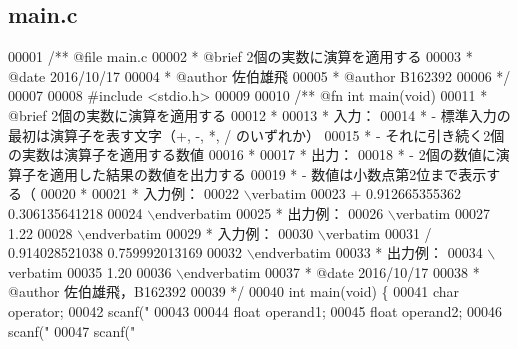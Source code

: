 \subsection{main.\-c}

\begin{DoxyCode}
00001 \textcolor{comment}{/**  @file main.c}
00002 \textcolor{comment}{ *   @brief  2個の実数に演算を適用する}
00003 \textcolor{comment}{ *   @date   2016/10/17}
00004 \textcolor{comment}{ *   @author 佐伯雄飛}
00005 \textcolor{comment}{ *   @author B162392}
00006 \textcolor{comment}{ */}
00007 
00008 \textcolor{preprocessor}{#include <stdio.h>}
00009 \textcolor{comment}{}
00010 \textcolor{comment}{/** @fn int main(void)}
00011 \textcolor{comment}{ *  @brief  2個の実数に演算を適用する}
00012 \textcolor{comment}{ *}
00013 \textcolor{comment}{ *  入力：}
00014 \textcolor{comment}{ *  - 標準入力の最初は演算子を表す文字（+, -, *, / のいずれか）}
00015 \textcolor{comment}{ *  - それに引き続く2個の実数は演算子を適用する数値}
00016 \textcolor{comment}{ *}
00017 \textcolor{comment}{ *  出力：}
00018 \textcolor{comment}{ *  - 2個の数値に演算子を適用した結果の数値を出力する}
00019 \textcolor{comment}{ *  - 数値は小数点第2位まで表示する（%
00020 \textcolor{comment}{ *}
00021 \textcolor{comment}{ *  入力例：}
00022 \textcolor{comment}{\(\backslash\)verbatim}
00023 \textcolor{comment}{+ 0.912665355362 0.306135641218}
00024 \textcolor{comment}{\(\backslash\)endverbatim}
00025 \textcolor{comment}{  *  出力例：}
00026 \textcolor{comment}{\(\backslash\)verbatim}
00027 \textcolor{comment}{1.22}
00028 \textcolor{comment}{\(\backslash\)endverbatim}
00029 \textcolor{comment}{  *  入力例：}
00030 \textcolor{comment}{\(\backslash\)verbatim}
00031 \textcolor{comment}{/ 0.914028521038 0.759992013169}
00032 \textcolor{comment}{\(\backslash\)endverbatim}
00033 \textcolor{comment}{  *  出力例：}
00034 \textcolor{comment}{\(\backslash\)verbatim}
00035 \textcolor{comment}{1.20}
00036 \textcolor{comment}{\(\backslash\)endverbatim}
00037 \textcolor{comment}{ *  @date   2016/10/17}
00038 \textcolor{comment}{ *  @author 佐伯雄飛，B162392}
00039 \textcolor{comment}{ */}
00040 \textcolor{keywordtype}{int} main(\textcolor{keywordtype}{void}) \{
00041   \textcolor{keywordtype}{char} \textcolor{keyword}{operator};
00042   scanf(\textcolor{stringliteral}{"%
00043 
00044   \textcolor{keywordtype}{float} operand1;
00045   \textcolor{keywordtype}{float} operand2;
00046   scanf(\textcolor{stringliteral}{"%
00047   scanf(\textcolor{stringliteral}{"%
}}}}
\end{DoxyCode}
